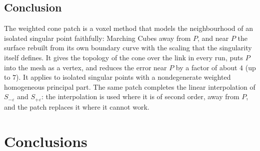 \documentclass[12pt, a4paper]{article}
\theoremstyle{plain}
\theoremstyle{definition}
\theoremstyle{remark}
\theoremstyle{definition}
\begin{document}
\subsection{Conclusion}

The weighted cone patch is a voxel method that models the neighbourhood of an
isolated singular point faithfully: Marching Cubes away from $P$, and near $P$ the
surface rebuilt from its own boundary curve with the scaling that the singularity
itself defines. It gives the topology of the cone over the link in every run, puts
$P$ into the mesh as a vertex, and reduces the error near $P$ by a factor of about $4$
(up to $7$). It applies to isolated singular points with a nondegenerate weighted
homogeneous principal part. The same patch completes the linear interpolation of
$S_{-\varepsilon}$ and $S_{+\varepsilon}$: the interpolation is used where it is of
second order, away from $P$, and the patch replaces it where it cannot work.

\section{Conclusions}
\label{sec:r-conclusions}
\end{document}
